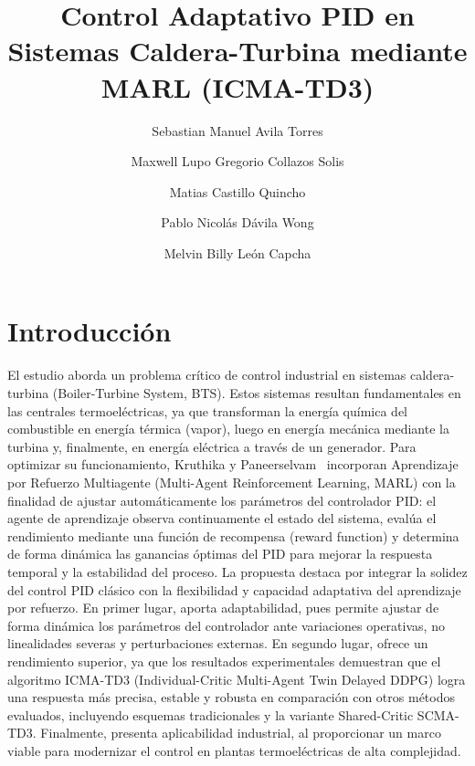 \documentclass[final,5p,times,twocolumn,authoryear,11pt]{elsarticle}
\begin{document}
\begin{frontmatter}

\title{Control Adaptativo PID en Sistemas Caldera-Turbina mediante MARL (ICMA-TD3)}

\author[first]{Sebastian Manuel Avila Torres}
\author[first]{Maxwell Lupo Gregorio Collazos Solis}
\author[first]{Matias Castillo Quincho}
\author[first]{Pablo Nicolás Dávila Wong}
\author[first]{Melvin Billy León Capcha}

\begin{abstract}

\end{abstract}


\end{frontmatter}

\section{Introducción}
\label{introduccion}

El estudio aborda un problema crítico de control industrial en sistemas caldera-turbina (Boiler-Turbine System, BTS). Estos sistemas resultan fundamentales en las centrales termoeléctricas, ya que transforman la energía química del combustible en energía térmica (vapor), luego en energía mecánica mediante la turbina y, finalmente, en energía eléctrica a través de un generador. Para optimizar su funcionamiento, Kruthika y Paneerselvam~\citep{kruthika2025novel} incorporan Aprendizaje por Refuerzo Multiagente (Multi-Agent Reinforcement Learning, MARL) con la finalidad de ajustar automáticamente los parámetros del controlador PID: el agente de aprendizaje observa continuamente el estado del sistema, evalúa el rendimiento mediante una función de recompensa (reward function) y determina de forma dinámica las ganancias óptimas del PID para mejorar la respuesta temporal y la estabilidad del proceso. La propuesta destaca por integrar la solidez del control PID clásico con la flexibilidad y capacidad adaptativa del aprendizaje por refuerzo. En primer lugar, aporta adaptabilidad, pues permite ajustar de forma dinámica los parámetros del controlador ante variaciones operativas, no linealidades severas y perturbaciones externas. En segundo lugar, ofrece un rendimiento superior, ya que los resultados experimentales demuestran que el algoritmo ICMA-TD3 (Individual-Critic Multi-Agent Twin Delayed DDPG) logra una respuesta más precisa, estable y robusta en comparación con otros métodos evaluados, incluyendo esquemas tradicionales y la variante Shared-Critic SCMA-TD3. Finalmente, presenta aplicabilidad industrial, al proporcionar un marco viable para modernizar el control en plantas termoeléctricas de alta complejidad.
\end{document}
